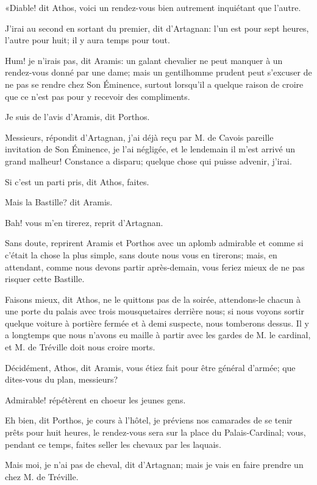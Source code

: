 «Diable! dit Athos, voici un rendez-vous bien autrement inquiétant que l'autre. 

\speak  J'irai au second en sortant du premier, dit d'Artagnan: l'un est pour sept heures, l'autre pour huit; il y aura temps pour tout. 

\speak  Hum! je n'irais pas, dit Aramis: un galant chevalier ne peut manquer à un rendez-vous donné par une dame; mais un gentilhomme prudent peut s'excuser de ne pas se rendre chez Son Éminence, surtout lorsqu'il a quelque raison de croire que ce n'est pas pour y recevoir des compliments. 

\speak  Je suis de l'avis d'Aramis, dit Porthos. 

\speak  Messieurs, répondit d'Artagnan, j'ai déjà reçu par M. de Cavois pareille invitation de Son Éminence, je l'ai négligée, et le lendemain il m'est arrivé un grand malheur! Constance a disparu; quelque chose qui puisse advenir, j'irai. 

\speak  Si c'est un parti pris, dit Athos, faites. 

\speak  Mais la Bastille? dit Aramis. 

\speak  Bah! vous m'en tirerez, reprit d'Artagnan. 

\speak  Sans doute, reprirent Aramis et Porthos avec un aplomb admirable et comme si c'était la chose la plus simple, sans doute nous vous en tirerons; mais, en attendant, comme nous devons partir après-demain, vous feriez mieux de ne pas risquer cette Bastille. 

\speak  Faisons mieux, dit Athos, ne le quittons pas de la soirée, attendons-le chacun à une porte du palais avec trois mousquetaires derrière nous; si nous voyons sortir quelque voiture à portière fermée et à demi suspecte, nous tomberons dessus. Il y a longtemps que nous n'avons eu maille à partir avec les gardes de M. le cardinal, et M. de Tréville doit nous croire morts. 

\speak  Décidément, Athos, dit Aramis, vous étiez fait pour être général d'armée; que dites-vous du plan, messieurs? 

\speak  Admirable! répétèrent en choeur les jeunes gens. 

\speak  Eh bien, dit Porthos, je cours à l'hôtel, je préviens nos camarades de se tenir prêts pour huit heures, le rendez-vous sera sur la place du Palais-Cardinal; vous, pendant ce temps, faites seller les chevaux par les laquais. 

\speak  Mais moi, je n'ai pas de cheval, dit d'Artagnan; mais je vais en faire prendre un chez M. de Tréville. 

